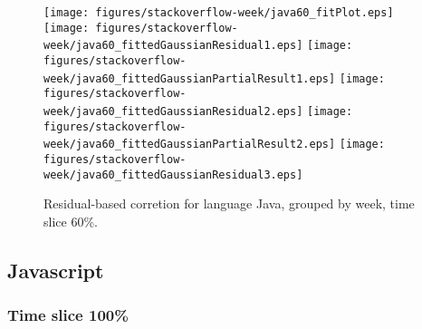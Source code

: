 \begin{figure}[hb]
\centering
{}
{\texttt{[image: figures/stackoverflow-week/java60\_fitPlot.eps]}}
{\texttt{[image: figures/stackoverflow-week/java60\_fittedGaussianResidual1.eps]}}
{\texttt{[image: figures/stackoverflow-week/java60\_fittedGaussianPartialResult1.eps]}}
{\texttt{[image: figures/stackoverflow-week/java60\_fittedGaussianResidual2.eps]}}
{\texttt{[image: figures/stackoverflow-week/java60\_fittedGaussianPartialResult2.eps]}}
{\texttt{[image: figures/stackoverflow-week/java60\_fittedGaussianResidual3.eps]}}
\caption{Residual-based corretion for language Java, grouped by week, time slice 60\%.}
\end{figure}


\clearpage 
\newpage 


\subsection{Javascript}

\FloatBarrier

\subsubsection{Time slice 100\%}

